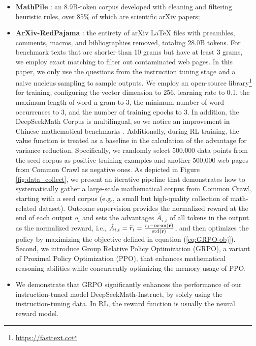 \begin{itemize}[topsep=0pt]
\begin{itemize}[topsep=0pt]
\begin{itemize}[topsep=0pt]
    \item \textbf{MathPile} \citep{mathpile}: an 8.9B-token corpus developed with cleaning and filtering heuristic rules, over 85\% of which are scientific arXiv papers;
    \item \textbf{ArXiv-RedPajama} \citep{redpajama}: the entirety of arXiv LaTeX files with preambles, comments, macros, and bibliographies removed, totaling 28.0B tokens. For benchmark texts that are shorter than 10 grams but have at least 3 grams, we employ exact matching to filter out contaminated web pages. In this paper, we only use the questions from the instruction tuning stage and a naive nucleus sampling to sample outputs. We employ an open-source library\footnote{\url{https://fasttext.cc}} for training, configuring the vector dimension to 256, learning rate to 0.1, the maximum length of word n-gram to 3, the minimum number of word occurrences to 3, and the number of training epochs to 3. In addition, the DeepSeekMath Corpus is multilingual, so we notice an improvement in Chinese mathematical benchmarks \citep{wei2023cmath,agieval}. Additionally, during RL training, the value function is treated as a baseline in the calculation of the advantage for variance reduction. Specifically, we randomly select 500,000 data points from the seed corpus as positive training examples and another 500,000 web pages from Common Crawl as negative ones. As depicted in Figure \ref{fig:data_collect}, we present an iterative pipeline that demonstrates how to systematically gather a large-scale mathematical corpus from Common Crawl, starting with a seed corpus (e.g., a small but high-quality collection of math-related dataset). Outcome supervision provides the normalized reward at the end of each output $o_i$  and sets the advantages  $\hat{A}_{i, t}$  of all tokens in the output as the normalized reward, i.e., $\hat{A}_{i, t} = \widetilde{r}_i = \frac{r_i- {\rm mean}(\mathbf{r})}{{\rm std}(\mathbf{r})}$, and then optimizes the policy by maximizing the objective defined in equation (\ref{eq:GRPO-obj}). Second, we introduce Group Relative Policy Optimization (GRPO), a variant of Proximal Policy Optimization (PPO), that enhances mathematical reasoning abilities while concurrently optimizing the memory usage of PPO. \item We demonstrate that GRPO significantly enhances the performance of our instruction-tuned model DeepSeekMath-Instruct, by solely using the instruction-tuning data. In RL, the reward function is usually the neural reward model. 

\end{itemize}
\end{itemize}
\end{itemize}
